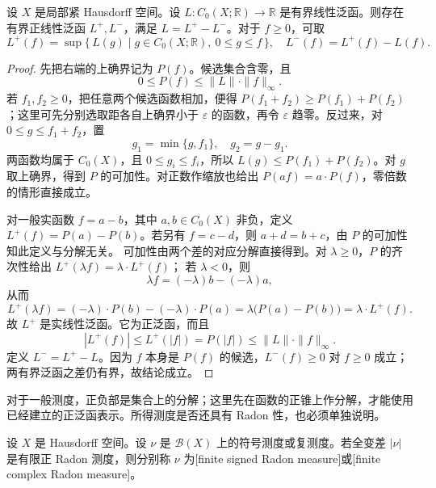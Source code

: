 \begin{lemma}\label{b1:lem:c0-functional-positive-parts}
设 \(X\) 是局部紧 Hausdorff 空间。设 \(L:C_0(X;\mathbb R)\rightarrow\mathbb R\) 是有界线性泛函。则存在有界正线性泛函 \(L^+,L^-\)，满足 \(L=L^+-L^-\)。对于 \(f\geq0\)，可取
\[
 L^+(f)=\sup\{\,L(g)\mid g\in C_0(X;\mathbb R),\ 0\leq g\leq f\,\},
 \quad L^-(f)=L^+(f)-L(f).
\]
\end{lemma}
\begin{proof}
先把右端的上确界记为 \(P(f)\)。候选集合含零，且
\[
 0\leq P(f)\leq\|L\|\cdot\|f\|_\infty.
\]
若 \(f_1,f_2\geq0\)，把任意两个候选函数相加，便得
\(P(f_1+f_2)\geq P(f_1)+P(f_2)\)；这里可先分别选取距各自上确界小于 \(\varepsilon\) 的函数，再令 \(\varepsilon\) 趋零。反过来，对 \(0\leq g\leq f_1+f_2\)，置
\[
 g_1=\min\{g,f_1\},\quad g_2=g-g_1.
\]
两函数均属于 \(C_0(X)\)，且 \(0\leq g_i\leq f_i\)，所以
\(L(g)\leq P(f_1)+P(f_2)\)。对 \(g\) 取上确界，得到 \(P\) 的可加性。对正数作缩放也给出 \(P(af)=a\cdot P(f)\)，零倍数的情形直接成立。

对一般实函数 \(f=a-b\)，其中 \(a,b\in C_0(X)\) 非负，定义
\(L^+(f)=P(a)-P(b)\)。若另有 \(f=c-d\)，则 \(a+d=b+c\)，由 \(P\) 的可加性知此定义与分解无关。
可加性由两个差的对应分解直接得到。对 \(\lambda\geq0\)，\(P\) 的齐次性给出 \(L^+(\lambda f)=\lambda \cdot L^+(f)\)；
若 \(\lambda<0\)，则
\[
 \lambda f=(-\lambda)b-(-\lambda)a,
\]
从而
\[
 L^+(\lambda f)=(-\lambda)\cdot P(b)-(-\lambda)\cdot P(a)
 =\lambda\bigl(P(a)-P(b)\bigr)=\lambda \cdot L^+(f).
\]
故 \(L^+\) 是实线性泛函。它为正泛函，而且
\[
 |L^+(f)|\leq L^+(|f|)=P(|f|)
 \leq\|L\|\cdot\|f\|_\infty.
\]
定义 \(L^-=L^+-L\)。因为 \(f\) 本身是 \(P(f)\) 的候选，\(L^-(f)\geq0\) 对 \(f\geq0\) 成立；两有界泛函之差仍有界，故结论成立。
\end{proof}

对于一般测度，正负部是集合上的分解；这里先在函数的正锥上作分解，才能使用已经建立的正泛函表示。所得测度是否还具有 Radon 性，也必须单独说明。

\begin{definition}\label{b1:def:finite-signed-complex-radon}
设 \(X\) 是 Hausdorff 空间。设 \(\nu\) 是 \(\mathcal B(X)\) 上的符号测度或复测度。若全变差 \(|\nu|\) 是有限正 Radon 测度，则分别称 \(\nu\) 为[finite signed Radon measure]或[finite complex Radon measure]。
\end{definition}

